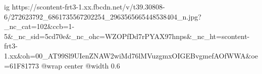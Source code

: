  
 
 
 
 

\ifcmt
  ig https://scontent-frt3-1.xx.fbcdn.net/v/t39.30808-6/272623792_6861735567202254_2963565665448538404_n.jpg?_nc_cat=102&ccb=1-5&_nc_sid=5cd70e&_nc_ohc=WZOPfDd7rPYAX97hnps&_nc_ht=scontent-frt3-1.xx&oh=00_AT99Sl9UIenZNAW2wiMd76lMVuzgmxOIGEBvgmefAOfWWA&oe=61F81773
	@wrap center
	@width 0.6
\fi

